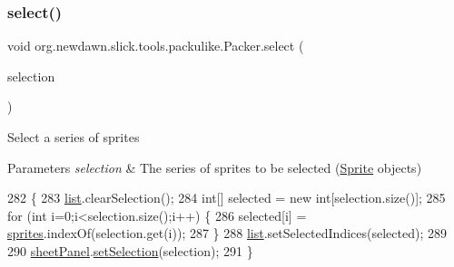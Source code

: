 \mbox{\label{classorg_1_1newdawn_1_1slick_1_1tools_1_1packulike_1_1_packer_a7811f0b2c45bb43e48fb3edbb65115e3}} 
\subsubsection{\texorpdfstring{select()}{select()}}
{\footnotesize\ttfamily void org.\+newdawn.\+slick.\+tools.\+packulike.\+Packer.\+select (\begin{DoxyParamCaption}\item[{Array\+List}]{selection }\end{DoxyParamCaption})\hspace{0.3cm}{\ttfamily [inline]}}

Select a series of sprites


\begin{DoxyParams}{Parameters}
{\em selection} & The series of sprites to be selected (\mbox{\hyperlink{classorg_1_1newdawn_1_1slick_1_1tools_1_1packulike_1_1_sprite}{Sprite}} objects) \\
\hline
\end{DoxyParams}

\begin{DoxyCode}
282                                             \{
283         \mbox{\hyperlink{classorg_1_1newdawn_1_1slick_1_1tools_1_1packulike_1_1_packer_a45e8438e951eb84f2efaf06e5ae481bd}{list}}.clearSelection();
284         \textcolor{keywordtype}{int}[] selected = \textcolor{keyword}{new} \textcolor{keywordtype}{int}[selection.size()];
285         \textcolor{keywordflow}{for} (\textcolor{keywordtype}{int} i=0;i<selection.size();i++) \{
286             selected[i] = \mbox{\hyperlink{classorg_1_1newdawn_1_1slick_1_1tools_1_1packulike_1_1_packer_a5684e96219ce89e574c4550d3c650eaa}{sprites}}.indexOf(selection.get(i));
287         \}
288         \mbox{\hyperlink{classorg_1_1newdawn_1_1slick_1_1tools_1_1packulike_1_1_packer_a45e8438e951eb84f2efaf06e5ae481bd}{list}}.setSelectedIndices(selected);
289         
290         \mbox{\hyperlink{classorg_1_1newdawn_1_1slick_1_1tools_1_1packulike_1_1_packer_af39b29a5c9105d3079b3e2df19008ad8}{sheetPanel}}.\mbox{\hyperlink{classorg_1_1newdawn_1_1slick_1_1tools_1_1packulike_1_1_sheet_panel_a059d3b0d4b88b10f3198da5a4b8394e4}{setSelection}}(selection);
291     \}
\end{DoxyCode}


